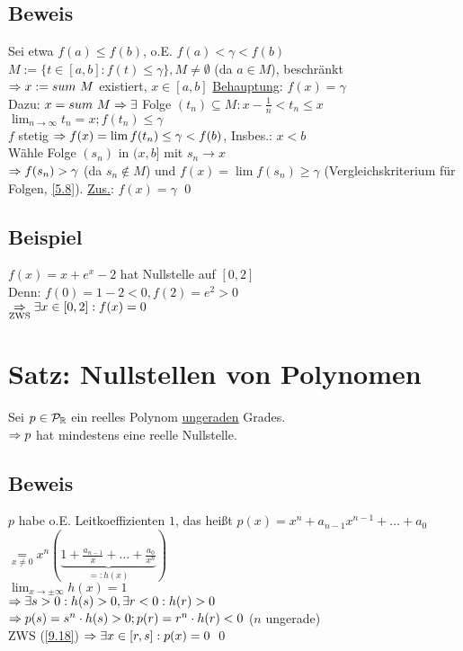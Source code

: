 \subsection*{Beweis}
Sei etwa $f(a) \le f(b)$, o.E. $f(a) < \gamma < f(b)$\\
$M := \{t \in [a,b]: f(t) \le \gamma\}, M \neq \emptyset$ (da $a \in M$), beschränkt\\
$\Rightarrow x := sum \ M$ existiert, $x \in [a,b]$\nl
\underline{Behauptung}: $f(x) = \gamma$\\
Dazu: $x = sum \ M \Rightarrow \exists$ Folge $(t_n) \subseteq M: x - \frac{1}{n} < t_n \le x$\\
$\lim_{n \to \infty} t_n = x; f(t_n) \le \gamma$\\
$f$ stetig $\Rightarrow f(x) = \lim f(t_n) \le \gamma < f(b)$, Insbes.: $x < b$\\
Wähle Folge $(s_n)$ in $(x,b]$ mit $s_n \to x$\\
$\Rightarrow f(s_n) > \gamma$ (da $s_n \notin M$) und $f(x) = \lim f(s_n) \ge \gamma$ (Vergleichskriterium für Folgen, \ref{5.8}).\nl
\underline{Zus.}: $f(x) = \gamma$ \qed

\subsection*{Beispiel}
$f(x) = x + e^x - 2$ hat Nullstelle auf $[0,2]$\\
Denn: $f(0) = 1 - 2 < 0, f(2) = e^2 > 0$\\
$\underset{\text{ZWS}}{\Rightarrow} \exists x \in [0,2]: f(x) = 0$

\newpage

\section{Satz: Nullstellen von Polynomen}\label{9.19}
Sei $p \in \mathcal{P}_{\mathbb{R}}$ ein reelles Polynom \underline{ungeraden} Grades.\\
$\Rightarrow p$ hat mindestens eine reelle Nullstelle.\nl
{}

\subsection*{Beweis}
$p$ habe o.E. Leitkoeffizienten $1$, das heißt $p(x) = x^n + a_{n-1} x^{n-1} + \ldots + a_0$\\
$\underset{x \neq 0}{=} x^n (\underbrace{1+\frac{a_{n-1}}{x} + \ldots + \frac{a_0}{x^n}}_{=: h(x)})$\\
$\lim_{x \to \pm \infty} h(x) = 1$\\
$\Rightarrow \exists s > 0: h(s) > 0, \exists r < 0: h(r) > 0$\\
$\Rightarrow p(s) = s^n \cdot h(s) > 0; p(r) = r^n \cdot h(r) < 0$ ($n$ ungerade)\\
ZWS (\ref{9.18}) $\Rightarrow \exists x \in [r,s]: p(x) = 0$ \qed

